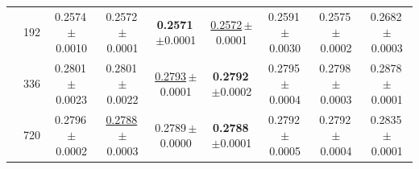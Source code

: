 \begin{tabular}{llccccccc}
 & 192 & 0.2574\,{\tiny$\pm$0.0010} & 0.2572\,{\tiny$\pm$0.0001} & \textbf{0.2571}\,{\tiny$\pm$0.0001} & \underline{0.2572}\,{\tiny$\pm$0.0001} & 0.2591\,{\tiny$\pm$0.0030} & 0.2575\,{\tiny$\pm$0.0002} & 0.2682\,{\tiny$\pm$0.0003} \\
 & 336 & 0.2801\,{\tiny$\pm$0.0023} & 0.2801\,{\tiny$\pm$0.0022} & \underline{0.2793}\,{\tiny$\pm$0.0001} & \textbf{0.2792}\,{\tiny$\pm$0.0002} & 0.2795\,{\tiny$\pm$0.0004} & 0.2798\,{\tiny$\pm$0.0003} & 0.2878\,{\tiny$\pm$0.0001} \\
 & 720 & 0.2796\,{\tiny$\pm$0.0002} & \underline{0.2788}\,{\tiny$\pm$0.0003} & 0.2789\,{\tiny$\pm$0.0000} & \textbf{0.2788}\,{\tiny$\pm$0.0001} & 0.2792\,{\tiny$\pm$0.0005} & 0.2792\,{\tiny$\pm$0.0004} & 0.2835\,{\tiny$\pm$0.0001} \\
\bottomrule
\end{tabular}
